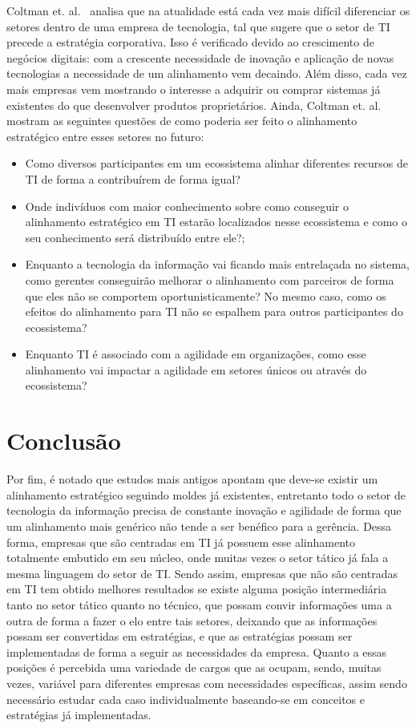 \documentclass[review]{elsarticle}
\begin{document}
Coltman et. al.~\cite{Coltman15} analisa que na atualidade está cada vez mais difícil diferenciar os setores dentro de uma empresa de tecnologia, tal que sugere que o setor de TI precede a estratégia corporativa. Isso é verificado devido ao crescimento de negócios digitais: com a crescente necessidade de inovação e aplicação de novas tecnologias a necessidade de um alinhamento vem decaindo. Além disso, cada vez mais empresas vem mostrando o interesse a adquirir ou comprar sistemas já existentes do que desenvolver produtos proprietários. Ainda, Coltman et. al. mostram as seguintes questões de como poderia ser feito o alinhamento estratégico entre esses setores no futuro: 

\begin{itemize}
	\item Como diversos participantes em um ecossistema alinhar diferentes recursos de TI de forma a contribuírem de forma igual?
	\item Onde indivíduos com maior conhecimento sobre como conseguir o alinhamento estratégico em TI estarão localizados nesse ecossistema e como o seu conhecimento será distribuído entre ele?;
	\item Enquanto a tecnologia da informação vai ficando mais entrelaçada no sistema, como gerentes conseguirão melhorar o alinhamento com parceiros de forma que eles não se comportem oportunisticamente? No mesmo caso, como os efeitos do alinhamento para TI não se espalhem para outros participantes do ecossistema?
	\item Enquanto TI é associado com a agilidade em organizações, como esse alinhamento vai impactar a agilidade em setores únicos ou através do ecossistema?
\end{itemize}

\section{Conclusão}
Por fim, é notado que estudos mais antigos apontam que deve-se existir um alinhamento estratégico seguindo moldes já existentes, entretanto todo o setor de tecnologia da informação precisa de constante inovação e agilidade de forma que um alinhamento mais genérico não tende a ser benéfico para a gerência. Dessa forma, empresas que são centradas em TI já possuem esse alinhamento totalmente embutido em seu núcleo, onde muitas vezes o setor tático já fala a mesma linguagem do setor de TI. Sendo assim, empresas que não são centradas em TI tem obtido melhores resultados se existe alguma posição intermediária tanto no setor tático quanto no técnico, que possam convir informações uma a outra de forma a fazer o elo entre tais setores, deixando que as informações possam ser convertidas em estratégias, e que as estratégias possam ser implementadas de forma a seguir as necessidades da empresa.
Quanto a essas posições é percebida uma variedade de cargos que as ocupam, sendo, muitas vezes, variável para diferentes empresas com necessidades específicas, assim sendo necessário estudar cada caso individualmente baseando-se em conceitos e estratégias já implementadas.



\end{document}
